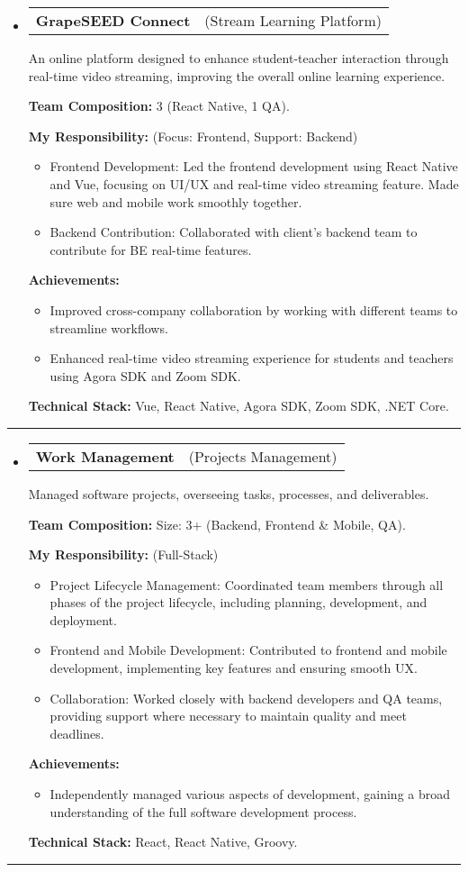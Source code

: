 \documentclass[letterpaper,11pt]{article}
\makeatletter
\newcommand{\resumeProjectTitle}[2]{
  \vspace{-2pt}\item
    \begin{tabular*}{1\textwidth}[t]{l @{\hskip 2pt} r}
      \textbf{#1} & \small #2 \\
    \end{tabular*}\vspace{2pt}
}
\newcommand{\resumeDesc}[1]{
  {#1\\ \vspace{2px}}
}
\newcommand{\resumeItem}[1]{
  \item{#1 \vspace{-2pt}}
}
\newcommand{\resumeItemListTitle}[1]{%
  \vspace{0pt} \textbf{#1} \vspace{-2pt}%
}
\newcommand{\resumeItemListStart}{\vspace{-4pt}\begin{itemize}[leftmargin=12px]}
\newcommand{\resumeItemListEnd}{\end{itemize}\vspace{-5pt}}
\newcommand{\resumeSubHeadingListStart}{\begin{itemize}[leftmargin=0pt, label={}]}
\newcommand{\resumeSubHeadingListEnd}{\end{itemize}\vspace{-8pt}}
\makeatother
\begin{document}
\resumeSubHeadingListStart
\resumeProjectTitle{GrapeSEED Connect}{(Stream Learning Platform)}
\resumeDesc{An online platform designed to enhance student-teacher interaction through real-time video streaming, improving the overall online learning experience.}
\resumeItemListTitle{Team Composition:} 3 (React Native, 1 QA).
\par
\resumeItemListTitle{My Responsibility:} (Focus: Frontend, Support: Backend)
\resumeItemListStart
    \resumeItem{Frontend Development: Led the frontend development using React Native and Vue, focusing on UI/UX and real-time video streaming feature. Made sure web and mobile work smoothly together.}
    \resumeItem{Backend Contribution: Collaborated with client's backend team to contribute for BE real-time features.}
\resumeItemListEnd
\resumeItemListTitle{Achievements:}
\resumeItemListStart
    \resumeItem{Improved cross-company collaboration by working with different teams to streamline workflows.}
    \resumeItem{Enhanced real-time video streaming experience for students and teachers using Agora SDK and Zoom SDK.}
\resumeItemListEnd
\resumeItemListTitle{Technical Stack:} Vue, React Native, Agora SDK, Zoom SDK, .NET Core.
\resumeSubHeadingListEnd
\noindent\rule{\textwidth}{0.4pt}

\resumeSubHeadingListStart
\resumeProjectTitle{Work Management}{(Projects Management)}
\resumeDesc{Managed software projects, overseeing tasks, processes, and deliverables.}
\resumeItemListTitle{Team Composition:} Size: 3+ (Backend, Frontend \& Mobile, QA).
\par
\resumeItemListTitle{My Responsibility:} (Full-Stack)
\resumeItemListStart
    \resumeItem{Project Lifecycle Management: Coordinated team members through all phases of the project lifecycle, including planning, development, and deployment.}
    \resumeItem{Frontend and Mobile Development: Contributed to frontend and mobile development, implementing key features and ensuring smooth UX.}
    \resumeItem{Collaboration: Worked closely with backend developers and QA teams, providing support where necessary to maintain quality and meet deadlines.}
\resumeItemListEnd
\resumeItemListTitle{Achievements:}
\resumeItemListStart
    \resumeItem{Independently managed various aspects of development, gaining a broad understanding of the full software development process.}
\resumeItemListEnd
\resumeItemListTitle{Technical Stack:} React, React Native, Groovy.
\resumeSubHeadingListEnd
\noindent\rule{\textwidth}{0.4pt}
\end{document}
